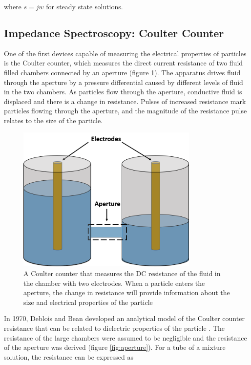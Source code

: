  \noindent where $s=jw$ for steady state solutions.

\subsection*{Impedance Spectroscopy: Coulter Counter}
\par One of the first devices capable of measuring the electrical properties of particles is the Coulter counter, which measures the direct current resistance of two fluid filled chambers connected by an aperture (figure \ref{fig:coulter_counter}). The apparatus drives fluid through the aperture by a pressure differential caused by different levels of fluid in the two chambers. As particles flow through the aperture, conductive fluid is displaced and there is a change in resistance. Pulses of increased resistance mark particles flowing through the aperture, and the magnitude of the resistance pulse relates to the size of the particle. 


\begin{figure}[ht]
    \centering
    \includegraphics[width=0.8\textwidth]{images/coultierCounter.png}
    \caption[Illustration of Coulter counter principles]{A Coulter counter that measures the DC resistance of the fluid in the chamber with two electrodes. When a particle enters the aperture, the change in resistance will provide information about the size and electrical properties of the particle}
    \label{fig:coulter_counter}
\end{figure}


In 1970, Deblois and Bean developed an analytical model of the Coulter counter resistance that can be related to dielectric properties of the particle \cite{deblois_counting_1970}. The resistance of the large chambers were assumed to be negligible and the resistance of the aperture was derived (figure \ref{fig:aperture}). For a tube of a mixture solution, the resistance can be expressed as


